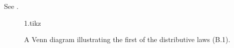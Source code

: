 \exercise
See .
\begin{figure}[htb]
    {1.tikz}
    \caption{A Venn diagram illustrating the first of the distributive laws (B.1).} \label{fig:B.1-1}
\end{figure}

